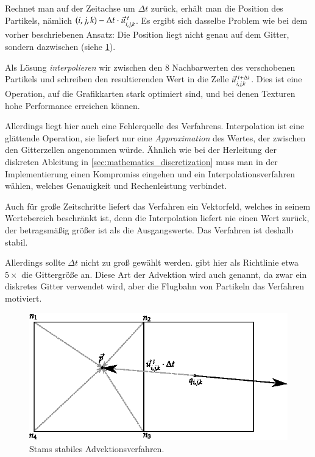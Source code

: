 Rechnet man auf der Zeitachse um $\Delta t$ zurück, erhält man die
 Position des Partikels, nämlich $(i,j,k) -
\Delta t \cdot \vec{u}_{i,j,k}^{\textnormal{ }t}$. Es ergibt
sich dasselbe Problem wie bei dem vorher beschriebenen Ansatz: Die
Position liegt nicht genau auf dem Gitter, sondern dazwischen (siehe
\cref{fig:stam_good_advection}).

Als Lösung \emph{interpolieren} wir zwischen den 8 Nachbarwerten des
verschobenen Partikels und schreiben den resultierenden Wert in die Zelle
$\vec{u}_{i,j,k}^{\textnormal{ }t+\Delta t}$. Dies ist eine Operation, auf die Grafikkarten stark
optimiert sind, und bei denen Texturen hohe Performance erreichen
können.

Allerdings liegt hier auch eine Fehlerquelle des Verfahrens. Interpolation ist
eine glättende Operation, sie liefert nur eine \emph{Approximation} des Wertes,
der zwischen den Gitterzellen angenommen würde. Ähnlich wie bei der
Herleitung der diskreten Ableitung in \cref{sec:mathematics_discretization}
muss man in der Implementierung einen Kompromiss eingehen und ein
Interpolationsverfahren wählen, welches Genauigkeit und Rechenleistung verbindet.

Auch für große Zeitschritte liefert das Verfahren ein Vektorfeld,
welches in seinem Wertebereich beschränkt ist, denn die Interpolation liefert nie einen
Wert zurück, der betragsmäßig größer ist als die Ausgangswerte. Das Verfahren
ist deshalb stabil.

Allerdings sollte $\Delta t$ nicht zu groß gewählt werden.
\cite{Foster} gibt hier als Richtlinie etwa $5\times$ die Gittergröße
an. Diese Art der Advektion wird auch
 genannt, da zwar ein
diskretes Gitter verwendet wird, aber die Flugbahn von Partikeln das
Verfahren motiviert.

\begin{figure}[ht]
\centering
\includegraphics[width=12cm]{images/advection_good}
\caption{Stams stabiles Advektionsverfahren.}
\label{fig:stam_good_advection}
\end{figure}

